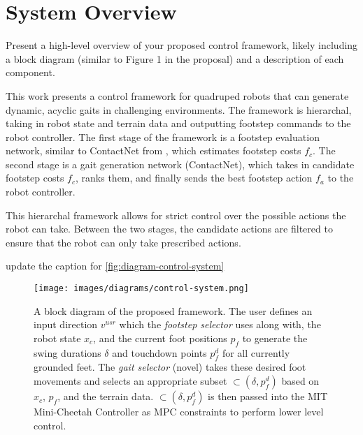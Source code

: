 \section{System Overview}

\begin{outline}
  Present a high-level overview of your proposed control framework,
  likely including a block diagram (similar to Figure 1 in the
  proposal) and a description of each component.
\end{outline}

This work presents a control framework for quadruped robots that
can generate dynamic, acyclic gaits in challenging environments. The
framework is hierarchal, taking in robot state and terrain data and
outputting footstep commands to the robot controller. The first stage of
the framework is a footstep evaluation network, similar to ContactNet
from \cite{bratta_contactnet_2024}, which estimates footstep costs $f_c$.
The second stage is a gait generation
network (ContactNet), which takes in candidate footstep costs $f_c$,
ranks them, and finally sends the best footstep action $f_a$ to the
robot controller.

This hierarchal framework allows for strict control over the possible
actions the robot can take. Between the two stages, the candidate
actions are filtered to ensure that the robot can only take prescribed
actions.

\begin{todo}
  update the caption for \autoref{fig:diagram-control-system}
\end{todo}

\begin{figure}[H]
  \centering
  \texttt{[image: images/diagrams/control-system.png]}
  \caption{A block diagram of the proposed framework. The user
    defines an input direction $v^{usr}$ which the \textit{footstep
    selector} \cite{bratta_contactnet_2024} uses along with, the robot
    state $x_c$, and the current foot positions $p_f$ to generate the
    swing durations $\delta$ and touchdown points $p_f^d$ for all
    currently grounded feet. The \textit{gait selector} (novel) takes
    these desired foot movements and selects an appropriate subset
    $\subset(\delta,p_f^d)$ based on $x_c$, $p_f$, and the terrain
    data. $\subset(\delta,p_f^d)$ is then passed into the MIT
  Mini-Cheetah Controller as MPC constraints to perform lower level control.}
  \label{fig:diagram-control-system}
\end{figure}
